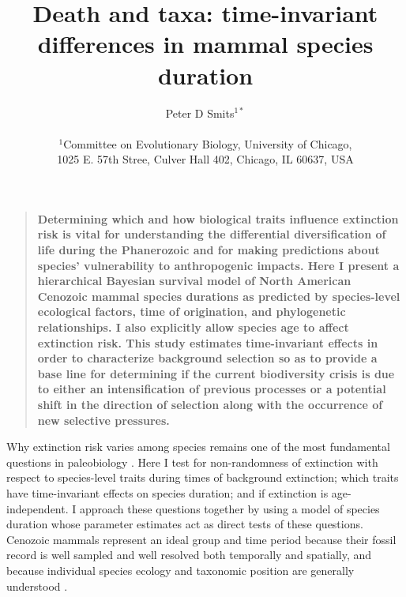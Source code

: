 \documentclass[12pt]{article}
\title{Death and taxa: time-invariant differences in mammal species duration}
\author
{Peter D Smits$^{1\ast}$\\
\\
\normalsize{$^{1}$Committee on Evolutionary Biology, University of Chicago,}\\
\normalsize{1025 E. 57th Stree, Culver Hall 402, Chicago, IL 60637, USA}\\
}
\date{}
\newenvironment{sciabstract}{%
\begin{quote} \bf}
{\end{quote}}
\begin{document}
 


\baselineskip24pt


\maketitle 
\linenumbers
\modulolinenumbers[2]


\begin{sciabstract}
  Determining which and how biological traits influence extinction risk is vital for understanding the differential diversification of life during the Phanerozoic and for making predictions about species' vulnerability to anthropogenic impacts. Here I present a hierarchical Bayesian survival model of North American Cenozoic mammal species durations as predicted by species-level ecological factors, time of origination, and phylogenetic relationships. I also explicitly allow species age to affect extinction risk. This study estimates time-invariant effects in order to characterize background selection so as to provide a base line for determining if the current biodiversity crisis is due to either an intensification of previous processes or a potential shift in the direction of selection along with the occurrence of new selective pressures.
\end{sciabstract}

Why extinction risk varies among species remains one of the most fundamental questions in paleobiology \cite{Simpson1944,VanValen1973,Raup1994,Quental2013,Wagner2014b}. Here I test for non-randomness of extinction with respect to species-level traits during times of background extinction; which traits have time-invariant effects on species duration; and if extinction is age-independent. I approach these questions together by using a model of species duration whose parameter estimates act as direct tests of these questions. Cenozoic mammals represent an ideal group and time period because their fossil record is well sampled and well resolved both temporally and spatially, and because individual species ecology and taxonomic position are generally understood \cite{Alroy2009,Liow2008,Smith2004,Quental2013,Simpson1944,Tomiya2013,Marcot2014}. 
\end{document}
